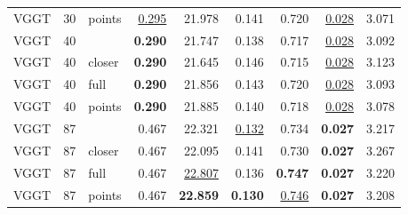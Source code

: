 \begin{table}[H]
\begin{tabular}{lrlrrrrrr}
VGGT & 30 & points & \underline{0.295} & 21.978 & 0.141 & 0.720 & \underline{0.028} & 3.071 \\
VGGT & 40 &  & \textbf{0.290} & 21.747 & 0.138 & 0.717 & \underline{0.028} & 3.092 \\
VGGT & 40 & closer & \textbf{0.290} & 21.645 & 0.146 & 0.715 & \underline{0.028} & 3.123 \\
VGGT & 40 & full & \textbf{0.290} & 21.856 & 0.143 & 0.720 & \underline{0.028} & 3.093 \\
VGGT & 40 & points & \textbf{0.290} & 21.885 & 0.140 & 0.718 & \underline{0.028} & 3.078 \\
VGGT & 87 &  & 0.467 & 22.321 & \underline{0.132} & 0.734 & \textbf{0.027} & 3.217 \\
VGGT & 87 & closer & 0.467 & 22.095 & 0.141 & 0.730 & \textbf{0.027} & 3.267 \\
VGGT & 87 & full & 0.467 & \underline{22.807} & 0.136 & \textbf{0.747} & \textbf{0.027} & 3.220 \\
VGGT & 87 & points & 0.467 & \textbf{22.859} & \textbf{0.130} & \underline{0.746} & \textbf{0.027} & 3.208 \\
\bottomrule
\end{tabular}
\end{table}
